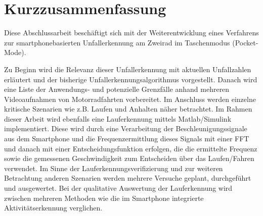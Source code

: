\chapter*{Kurzzusammenfassung}
%
%
%
%
%
%
%
%
%
%
%
%

Diese Abschlussarbeit beschäftigt sich mit der Weiterentwicklung eines Verfahrens zur smartphonebasierten Unfallerkennung am Zweirad im Taschenmodus (Pocket-Mode). 

Zu Beginn wird die Relevanz dieser Unfallerkennung mit aktuellen Unfallzahlen erläutert und der bisherige Unfallerkennungsalgorithmus vorgestellt.
Danach wird eine Liste der Anwendungs- und potenzielle Grenzfälle anhand mehreren Videoaufnahmen von Motorradfahrten vorbereitet. Im Anschluss werden einzelne kritische Szenarien wie z.B. Laufen und Anhalten näher betrachtet.
Im Rahmen dieser Arbeit wird ebenfalls eine Lauferkennung mittels Matlab/Simulink implementiert. Diese wird durch eine Verarbeitung der Beschleunigungssignale aus dem Smartphone und die Frequenzermittlung dieses Signals mit einer FFT und danach mit einer Entscheidungsfunktion erfolgen, die die ermittelte Frequenz sowie die gemessenen Geschwindigkeit zum Entscheiden über das Laufen/Fahren verwendet.
Im Sinne der Lauferkennungsverifizierung und zur weiteren Betrachtung anderen Szenarien werden mehrere Versuche geplant, durchgeführt und ausgewertet.
Bei der qualitative Auswertung der Lauferkennung wird zwischen mehreren Methoden wie die im Smartphone integrierte Aktivitätserkennung verglichen. 




